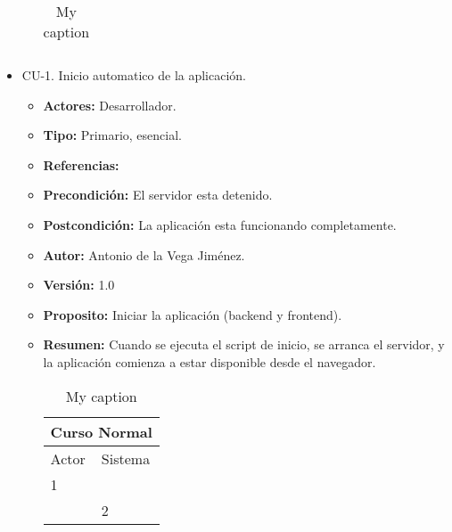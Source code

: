 \begin{itemize}
\begin{itemize}
\begin{table}[H]
\begin{tabularx}{\textwidth}{|X|X|}
                                    &                              \\ \hline
      \end{tabularx}
      \caption{My caption}
      \label{my-label}
    \end{table}
  \end{itemize}
  \item CU-1. Inicio automatico de la aplicación.
  \begin{itemize}
    \item \textbf{Actores:} Desarrollador.
    \item \textbf{Tipo:} Primario, esencial.
    \item \textbf{Referencias:}
    \item \textbf{Precondición:} El servidor esta detenido.
    \item \textbf{Postcondición:} La aplicación esta funcionando completamente.
    \item \textbf{Autor:} Antonio de la Vega Jiménez.
    \item \textbf{Versión:} 1.0
    \item \textbf{Proposito:} Iniciar la aplicación (backend y frontend).
    \item \textbf{Resumen:} Cuando se ejecuta el script de inicio, se arranca el servidor, y la aplicación comienza a estar disponible desde el navegador.
    \begin{table}[H]
      \centering
      \begin{tabularx}{\textwidth}{|X|X|X|X|}
        \hline
        \multicolumn{4}{|c|}{\cellcolor[HTML]{C0C0C0}Curso Normal}                                                 \\ \hline
        \multicolumn{2}{|l|}{\cellcolor[HTML]{EFEFEF}Actor} & \multicolumn{2}{l|}{\cellcolor[HTML]{EFEFEF}Sistema} \\ \hline
        1                         &                         &                            &                         \\ \hline
                                  &                         & 2                          &                         \\ \hline
      \end{tabularx}
      \caption{My caption}
      \label{my-label}
    \end{table}

\end{itemize}
\end{itemize}
